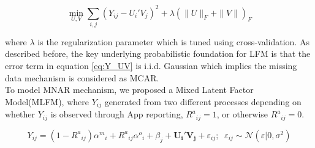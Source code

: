 \documentclass[preprint,12pt]{elsarticle}
\begin{document}
\[\min_{U,V}\sum\limits_{i, j}(Y_{ij} -  U_i' V_j)^2 + \lambda (\|U \|_F + \|V \|)_F\] 

where $\lambda$ is the regularization parameter which is tuned using cross-validation. As described before, the key underlying probabilistic foundation for LFM is that the error term in equation \ref{eq:Y_UV} is i.i.d. Gaussian which implies the missing data mechanism is considered as MCAR. 
\\

To model MNAR mechanism, we proposed a Mixed Latent Factor Model(MLFM), where $Y_{ij}$ generated from two different processes depending on whether $Y_{ij}$ is observed through App reporting, ${R^a}_{ij}=1$, or otherwise ${R^a}_{ij}=0$.
 
\begin{equation}\label{eq:MLFM}
{Y_{ij}} = (1 - {R^a}_{ij}){\alpha ^m}_i + {R^a}_{ij}{\alpha ^o}_i + {\beta _j} + {{\mathbf{U}}_{\mathbf{i}}}{\mathbf{'}}{{\mathbf{V}}_{\mathbf{j}}} + {\varepsilon _{ij}};\;\;{\varepsilon _{ij}} \sim \mathcal{N}(\varepsilon |0,{\sigma ^2})
\end{equation}
\end{document}
